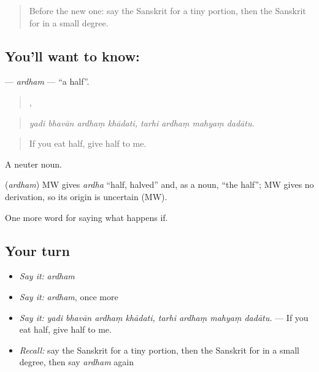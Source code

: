 \label{lesson:SA-C378-ardham}



\begin{quote}
Before the new one: say the Sanskrit for a tiny portion, then the Sanskrit for in a small degree.
\end{quote}

\subsection*{You'll want to know: }
\textbf{} — \emph{ardham} — \textquotedblleft{}a half\textquotedblright{}.

\begin{quote}
   ,    
\end{quote}

\begin{quote}
\emph{yadi bhavān ardhaṃ khādati, tarhi ardhaṃ mahyaṃ dadātu.}
\end{quote}

\begin{quote}
If you eat half, give half to me.
\end{quote}

A neuter noun.

\begin{cousinweb}
\textbf{} (\emph{ardham}) MW gives \emph{ardha} \textquotedblleft{}half, halved\textquotedblright{} and, as a noun, \textquotedblleft{}the half\textquotedblright{}; MW gives no derivation, so its origin is uncertain (MW).
\end{cousinweb}

\begin{grammarlens}[title={What you've built}]
One more word for saying what happens if.
\end{grammarlens}

\subsection*{Your turn}
\begin{itemize}
\raggedright
  \item \emph{Say it:} \emph{ardham}
  \item \emph{Say it:} \emph{ardham}, once more
  \item \emph{Say it:} \emph{yadi bhavān ardhaṃ khādati, tarhi ardhaṃ mahyaṃ dadātu.} — If you eat half, give half to me.
  \item \emph{Recall:} say the Sanskrit for a tiny portion, then the Sanskrit for in a small degree, then say \emph{ardham} again
\end{itemize}

